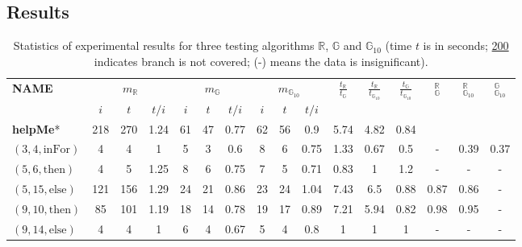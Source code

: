 \documentclass[sigconf,review]{acmart}
\newcommand{\thenBr}{\text{then}}
\newcommand{\elseBr}{\text{else}}
\newcommand{\inFor}{\text{inFor}}
\newcommand{\Random}{\mathbb{R}}
\newcommand{\Genetic}{\mathbb{G}}
\newcommand{\RGenetic}{\mathbb{G}_{10}}
\begin{document}
\subsection{Results}
\label{sub.sec.eval.results}

\setlength\tabcolsep{.98pt}
\begin{table}[!t]
  \caption{Statistics of experimental results for three testing algorithms $\Random$, $\Genetic$ and $\RGenetic$ (time $t$ is in seconds; \underline{200} indicates branch is not covered; (-) means the data is insignificant).}
  \label{tbl.stats}
    \scriptsize
    \begin{tabular}{l|ccc|ccc|ccc|ccc|ccc}
      \toprule
      \multirow{2}{*}{\textbf{NAME}} &   \multicolumn{3}{c|}{$m_{\Random}$} & \multicolumn{3}{c|}{$m_{\Genetic}$} & \multicolumn{3}{c|}{$m_{\RGenetic}$} & \multirow{2}{*}{$\frac{t_{\Random}}{t_{\Genetic}}$} &  \multirow{2}{*}{$\frac{t_{\Random}}{t_{\RGenetic}}$} & \multirow{2}{*}{$\frac{t_{\Genetic}}{t_{\RGenetic}}$}   & \multirow{2}{*}{\hfil $_{\Genetic}^{\Random}$} &  \multirow{2}{*}{\hfil $_{\RGenetic}^{\Random}$} & \multirow{2}{*}{\hfil $_{\RGenetic}^{\Genetic}$} \\
      \cline{2-10} %
                             & $i$      & $t$  & $t/i$     & $i$& $t$&$t/i$             &$i$ &$t$ &$t/i$               &      &       &        &      &       &      \\
      \midrule
    \textbf{helpMe}*         & 218      & 270  & 1.24      & 61 & 47 & 0.77             & 62 & 56 & 0.9                & 5.74 & 4.82  & 0.84   &      &      &       \\
    $(3,4,\inFor)$           & 4        & 4    & 1         & 5  & 3  & 0.6              & 8  & 6  & 0.75               & 1.33 & 0.67  & 0.5    & - & 0.39 & 0.37  \\
    $(5,6,\thenBr)$          & 4        & 5    & 1.25      & 8  & 6  & 0.75             & 7  & 5  & 0.71               & 0.83 & 1     & 1.2    & - & -  & -  \\
    $(5,15,\elseBr)$         & 121      & 156  & 1.29      & 24 & 21 & 0.86             & 23 & 24 & 1.04               & 7.43 & 6.5   & 0.88   & 0.87 & 0.86 & -  \\
    $(9,10,\thenBr)$         & 85       & 101  & 1.19      & 18 & 14 & 0.78             & 19 & 17 & 0.89               & 7.21 & 5.94  & 0.82   & 0.98 & 0.95 & -  \\
    $(9,14,\elseBr)$         & 4        & 4    & 1         & 6  & 4  & 0.67             & 5  & 4  & 0.8                & 1    & 1     & 1      & - & - & -  \\

\end{tabular}
\end{table}
\end{document}
